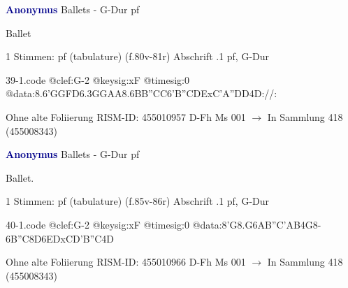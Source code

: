 \documentclass[twocolumn]{book}
\begin{document}
\newline \par \vspace{7pt} \textcolor{darkblue}{\textbf{Anonymus  }}
\newline Ballets - G-Dur
\newline pf
\newline \begin{itshape}[f.80v, at left:] Ballet\end{itshape} 
\newline \textcolor{darkblue}{}  1 Stimmen: pf (tabulature)  (f.80v-81r)
\newline Abschrift
.1  pf, G-Dur  
\begin{filecontents*}{39-1.code}
@clef:G-2
@keysig:xF
@timesig:0
@data:8.6{'GG}{FD}{6.3GGAA}{8.6BB}{''CC}{6'B''CDE}{xC'A''DD}4D://:
\end{filecontents*}
\newline
%
\newline Ohne alte Foliierung
\newline RISM-ID: 455010957
\newline D-Fh  Ms 001
\newline $\rightarrow$ In Sammlung 418 (455008343)
      
\newline \par \vspace{7pt} \textcolor{darkblue}{\textbf{Anonymus  }}
\newline Ballets - G-Dur
\newline pf
\newline \begin{itshape}[f.85v, at left:] Ballet.\end{itshape} 
\newline \textcolor{darkblue}{}  1 Stimmen: pf (tabulature)  (f.85v-86r)
\newline Abschrift
.1  pf, G-Dur  
\begin{filecontents*}{40-1.code}
@clef:G-2
@keysig:xF
@timesig:0
@data:8'G{8.G6A}{B''C'AB}4G8-{6B''C}{8D6ED}{xCD'B''C}4D
\end{filecontents*}
\newline
%
\newline Ohne alte Foliierung
\newline RISM-ID: 455010966
\newline D-Fh  Ms 001
\newline $\rightarrow$ In Sammlung 418 (455008343)
      
\end{document}
